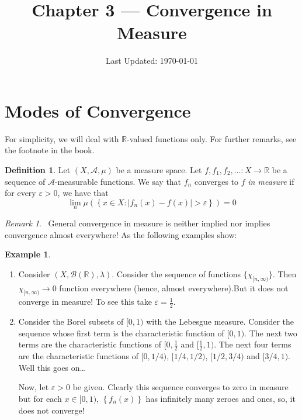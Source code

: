 \documentclass[12pt]{article}
\title{Chapter 3 --- Convergence in Measure}
\author{}
\date{Last Updated: \today}
\theoremstyle{definition}
\newtheorem{definition}[theorem]{Definition}
\newtheorem{example}[theorem]{Example}
\theoremstyle{remark}
\newtheorem{remark}[theorem]{Remark}
\theoremstyle{plain}
\newcommand{\R}{\mathbb R}
\newcommand{\scrA}{{\mathscr A}}
\newcommand{\scrB}{{\mathscr B}}
\begin{document}
\maketitle
\tableofcontents

\section{Modes of Convergence}

For simplicity, we will deal with $\R$-valued functions only. For further remarks, see the footnote in the book.

\begin{definition}
    Let $\left( X, \scrA , \mu \right)$ be a measure space. Let $f, f_1 ,f_2 ,\ldots : X\to \R$ be a sequence of $\scrA$-measurable functions. We say that $f_n$ converges to $f$ \textit{in measure} if for every $\varepsilon > 0$, we have that
    \begin{equation*}
	\lim_n \mu \left( \left\{ x \in X : \Big| f_n \left( x \right) - f\left( x \right) \Big| > \varepsilon \right\} \right)=0
    \end{equation*}
\end{definition}

\begin{remark}
    \warning \,  General convergence in measure is neither implied nor implies convergence almost everywhere! As the following examples show:
\end{remark}

\begin{example}
    \begin{enumerate}
	\item Consider $\left( X, \scrB (\R) , \lambda \right)$. Consider the sequence of functions $\{\chi _ {[n, \infty)}\}$. Then $\chi_{[n, \infty)} \to 0$ function everywhere (hence, almost everywhere).But it does not converge in measure! To see this take $\varepsilon = \frac{1}{2}$. 
	\item Consider the Borel subsets of $[0, 1)$ with the Lebesgue measure. Consider the sequence whose first term is the characteristic function of $[0,1)$. The next two terms are the characteristic functions of $[0,\frac{1}{2}$ and $[\frac{1}{2}, 1)$. The next four terms are the characteristic functions of $[0, 1/4)$, $[1/4,1/2)$, $[1/2, 3/4)$ and $[3/4, 1)$. Well this goes on\ldots

		Now, let $\varepsilon > 0$ be given. Clearly this sequence converges to zero in measure but for each $x\in [0,1)$, $\left\{ f_n (x) \right\}$ has infinitely many zeroes and ones, so, it does not converge!
    \end{enumerate}
\end{example}
\end{document}
